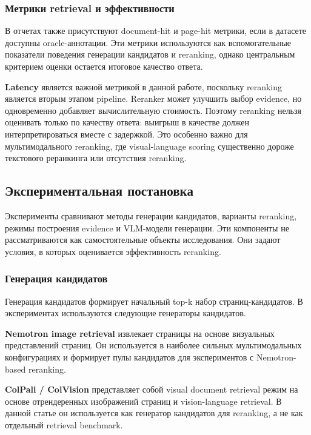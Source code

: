 \documentclass[conference]{IEEEtran}
\begin{document}
\subsubsection{Метрики retrieval и эффективности}

В отчетах также присутствуют document-hit и page-hit метрики, если в датасете доступны oracle-аннотации. Эти метрики используются как вспомогательные показатели поведения генерации кандидатов и reranking, однако центральным критерием оценки остается итоговое качество ответа.

\textbf{Latency} является важной метрикой в данной работе, поскольку reranking является вторым этапом pipeline. Reranker может улучшить выбор evidence, но одновременно добавляет вычислительную стоимость. Поэтому reranking нельзя оценивать только по качеству ответа: выигрыш в качестве должен интерпретироваться вместе с задержкой. Это особенно важно для мультимодального reranking, где visual-language scoring существенно дороже текстового реранкинга или отсутствия reranking.

\subsection{Экспериментальная постановка}

Эксперименты сравнивают методы генерации кандидатов, варианты reranking, режимы построения evidence и VLM-модели генерации. Эти компоненты не рассматриваются как самостоятельные объекты исследования. Они задают условия, в которых оценивается эффективность reranking.

\subsubsection{Генерация кандидатов}

Генерация кандидатов формирует начальный top-k набор страниц-кандидатов. В экспериментах используются следующие генераторы кандидатов.

\textbf{Nemotron image retrieval} извлекает страницы на основе визуальных представлений страниц. Он используется в наиболее сильных мультимодальных конфигурациях и формирует пулы кандидатов для экспериментов с Nemotron-based reranking.

\textbf{ColPali / ColVision} представляет собой visual document retrieval режим на основе отрендеренных изображений страниц и vision-language retrieval. В данной статье он используется как генератор кандидатов для reranking, а не как отдельный retrieval benchmark.
\end{document}
